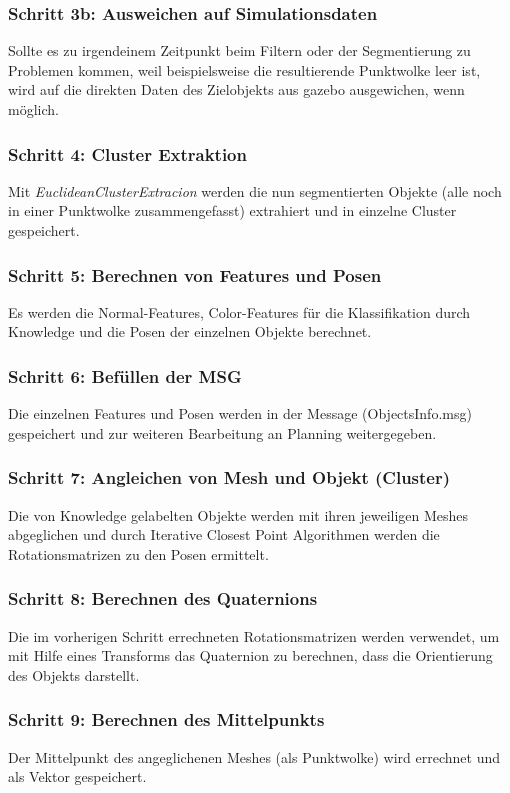 \documentclass{suturo}
\begin{document}
\subsubsection{Schritt 3b: Ausweichen auf Simulationsdaten}
Sollte es zu irgendeinem Zeitpunkt beim Filtern oder der Segmentierung zu Problemen kommen, weil beispielsweise die resultierende Punktwolke leer ist, wird auf die direkten Daten des Zielobjekts aus gazebo ausgewichen, wenn möglich.
\\
\subsubsection{Schritt 4: Cluster Extraktion}
Mit \textit{EuclideanClusterExtracion} werden die nun segmentierten Objekte (alle noch in einer Punktwolke zusammengefasst) extrahiert und in einzelne Cluster gespeichert.
\\
\subsubsection{Schritt 5: Berechnen von Features und Posen}
Es werden die Normal-Features, Color-Features für die Klassifikation durch Knowledge und die Posen der einzelnen Objekte berechnet.
 
\subsubsection{Schritt 6: Befüllen der MSG}
Die einzelnen Features und Posen werden in der Message (ObjectsInfo.msg) gespeichert und zur weiteren Bearbeitung an Planning weitergegeben.

\subsubsection{Schritt 7: Angleichen von Mesh und Objekt (Cluster)}
Die von Knowledge gelabelten Objekte werden mit ihren jeweiligen Meshes abgeglichen und durch Iterative Closest Point Algorithmen werden die Rotationsmatrizen zu den Posen ermittelt.

\subsubsection{Schritt 8: Berechnen des Quaternions }
Die im vorherigen Schritt errechneten Rotationsmatrizen werden verwendet, um mit Hilfe eines Transforms das Quaternion zu berechnen, dass die Orientierung des Objekts darstellt. 

\subsubsection{Schritt 9: Berechnen des Mittelpunkts }
Der Mittelpunkt des angeglichenen Meshes (als Punktwolke) wird errechnet und als Vektor gespeichert.
\\
\end{document}
